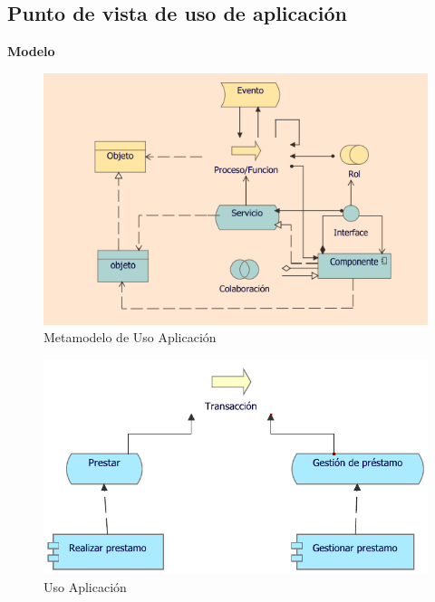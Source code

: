 	\subsection{Punto de vista de uso de aplicación}
	{
		
		\textbf{Modelo}\\
		\begin{figure}[H]
			\centering
			\includegraphics[width=0.8\linewidth]{development/usoapp.png}
			\caption{Metamodelo de Uso Aplicación}
		\end{figure}
		
		
		\begin{figure}[H]
			\centering
			\includegraphics[width=0.8\linewidth]{development/usoapp.pdf}
			\caption{Uso Aplicación}
		\end{figure}
	}
	
